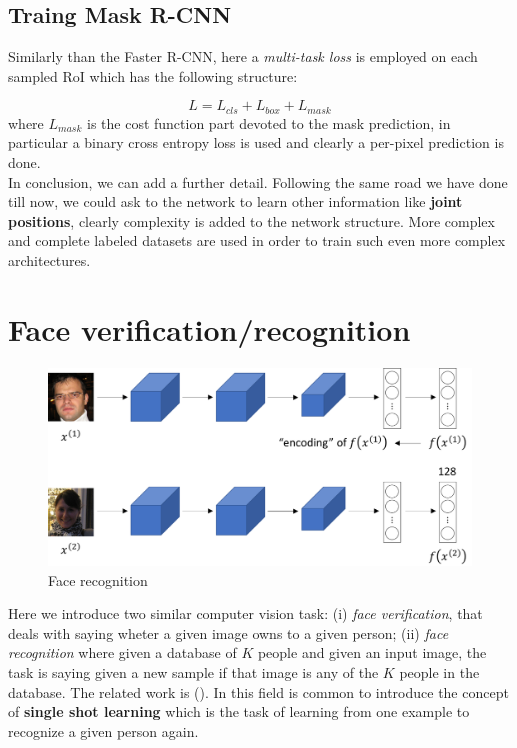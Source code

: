 \subsection{Traing Mask R-CNN}
Similarly than the Faster R-CNN, here a \textit{multi-task loss} is employed on each sampled RoI which has the following structure:

\begin{equation}
    L = L_{cls}+L_{box}+L_{mask}
\end{equation}
\noindent
where $L_{mask}$ is the cost function part devoted to the mask prediction, in particular a binary cross entropy loss is used and clearly a per-pixel prediction is done.\\

\noindent
In conclusion, we can add a further detail. Following the same road we have done till now, we could ask to the network to learn other information like \textbf{joint positions}, clearly complexity is added to the network structure. More complex and complete labeled datasets are used in order to train such even more complex architectures.

\section{Face verification/recognition}
\begin{figure}[h]
    \centering
    \includegraphics[scale=0.6]{img/face_recognition.png}
    \caption{Face recognition}
\end{figure}

\noindent
Here we introduce two similar computer vision task: (i) \textit{face verification}, that deals with saying wheter a given image owns to a given person; (ii) \textit{face recognition} where given a database of $K$ people and given an input image, the task is saying given a new sample if that image is any of the $K$ people in the database. The related work is \textit{} (\cite{schroff2015facenet}). 
In this field is common to introduce the concept of \textbf{single shot learning} which is the task of learning from one example to recognize a given person again.

